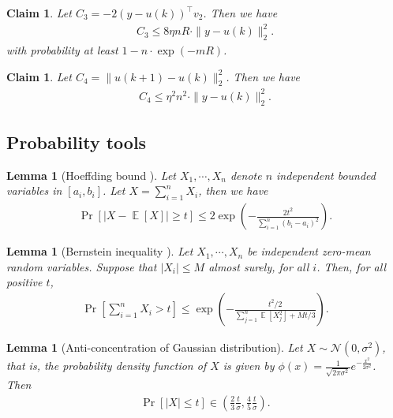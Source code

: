 \documentclass[11pt]{article}
\DeclareMathOperator*{\E}{\mathbb{E}}
\newcommand{\N}{\mathcal{N}}
\newtheorem{lemma}[theorem]{Lemma}
\newtheorem{claim}[theorem]{Claim}
\begin{document}
\begin{claim}\label{cla:C3}
Let $C_3 = - 2 (y - u(k))^\top v_2$. Then we have
\begin{align*}
C_3 \leq 8 \eta nR\cdot \| y - u(k) \|_2^2  .
\end{align*}
with probability at least $1-n\cdot \exp(-mR)$.
\end{claim}









\begin{claim}\label{cla:C4}
Let $C_4  = \| u (k+1) - u(k) \|_2^2$. Then we have
\begin{align*}
C_4 \leq \eta^2 n^2 \cdot \| y - u(k) \|_2^2.
\end{align*}
\end{claim}

\subsection{Probability tools}


\begin{lemma}[Hoeffding bound \cite{h63}]\label{lem:hoeffding}
Let $X_1, \cdots, X_n$ denote $n$ independent bounded variables in $[a_i,b_i]$. Let $X= \sum_{i=1}^n X_i$, then we have
\begin{align*}
\Pr[ | X - \E[X] | \geq t ] \leq 2\exp \left( - \frac{2t^2}{ \sum_{i=1}^n (b_i - a_i)^2 } \right).
\end{align*}
\end{lemma}

\begin{lemma}[Bernstein inequality \cite{b24}]\label{lem:bernstein}
Let $X_1, \cdots, X_n$ be independent zero-mean random variables. Suppose that $|X_i| \leq M$ almost surely, for all $i$. Then, for all positive $t$,
\begin{align*}
\Pr \left[ \sum_{i=1}^n X_i > t \right] \leq \exp \left( - \frac{ t^2/2 }{ \sum_{j=1}^n \E[X_j^2]  + M t /3 } \right).
\end{align*}
\end{lemma}

\begin{lemma}[Anti-concentration of Gaussian distribution]\label{lem:anti_gaussian}
Let $X\sim {\N}(0,\sigma^2)$,
that is,
the probability density function of $X$ is given by $\phi(x)=\frac 1 {\sqrt{2\pi\sigma^2}}e^{-\frac {x^2} {2\sigma^2} }$.
Then
\begin{align*}
    \Pr[|X|\leq t]\in \left( \frac 2 3\frac t \sigma, \frac 4 5\frac t \sigma \right).
\end{align*}
\end{lemma}




\end{document}
